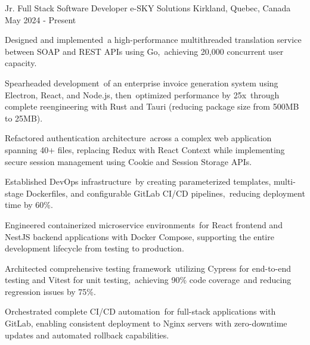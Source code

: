 

\begin{cventries}

  \cventry
   {Jr. Full Stack Software Developer} %
    {e-SKY Solutions} %
    {Kirkland, Quebec, Canada} %
    {May 2024 - Present} %
    {
      \begin{cvitems} %
        \item {Designed and implemented a high-performance multithreaded translation service between SOAP and REST APIs using Go, achieving 20,000 concurrent user capacity.}
        \item {Spearheaded development of an enterprise invoice generation system using Electron, React, and Node.js, then optimized performance by 25x through complete reengineering with Rust and Tauri (reducing package size from 500MB to 25MB).}
        \item {Refactored authentication architecture across a complex web application spanning 40+ files, replacing Redux with React Context while implementing secure session management using Cookie and Session Storage APIs.}
        \item {Established DevOps infrastructure by creating parameterized templates, multi-stage Dockerfiles, and configurable GitLab CI/CD pipelines, reducing deployment time by 60\%.}
        \item {Engineered containerized microservice environments for React frontend and NestJS backend applications with Docker Compose, supporting the entire development lifecycle from testing to production.}
        \item{Architected comprehensive testing framework utilizing Cypress for end-to-end testing and Vitest for unit testing, achieving 90\% code coverage and reducing regression issues by 75\%.}
        \item{Orchestrated complete CI/CD automation for full-stack applications with GitLab, enabling consistent deployment to Nginx servers with zero-downtime updates and automated rollback capabilities.}
      \end{cvitems}
    }
    

\end{cventries}
